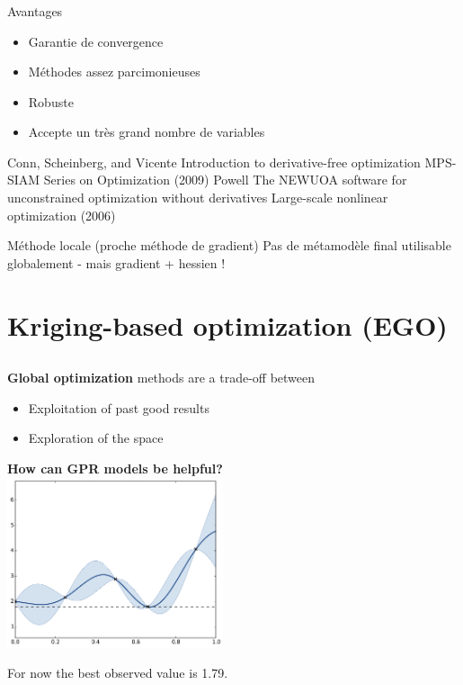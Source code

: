 \documentclass{beamer}
\begin{document}
\begin{frame}
\frametitle{}
\begin{block}{Avantages}
\begin{itemize}
 \item Garantie de convergence
 \item Méthodes assez parcimonieuses
 \item Robuste
 \item Accepte un très grand nombre de variables
\end{itemize}
\scriptsize{
 \begin{thebibliography}{1}
\beamertemplatearticlebibitems
     Conn, Scheinberg, and Vicente
         \newblock Introduction to derivative-free optimization
         \newblock MPS-SIAM Series on Optimization (2009)
          Powell
         \newblock The NEWUOA software for unconstrained optimization without derivatives
         \newblock Large-scale nonlinear optimization (2006)    
 \end{thebibliography}}
\end{block}

\begin{alertblock}{Méthode locale (proche méthode de gradient)}
Pas de métamodèle final utilisable globalement - mais gradient + hessien !
\end{alertblock}
\end{frame}

\section[EG0]{Kriging-based optimization (EGO)}
\subsection{}

\begin{frame}{}
\textbf{Global optimization} methods are a trade-off between
\begin{itemize}
	\item Exploitation of past good results
	\item Exploration of the space
\end{itemize}
\begin{center}
\textbf{How can GPR models be helpful?}\\
\includegraphics[height=5cm]{figures/python/ego_improv}
\end{center}
For now the best observed value is 1.79.
\end{frame}
\end{document}
